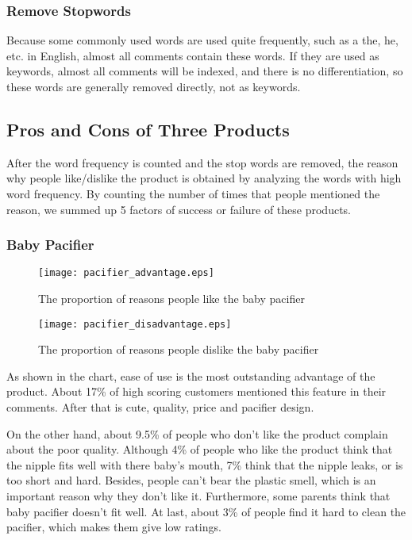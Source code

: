\documentclass{mcmthesis}
\begin{document}
	\subsubsection{Remove Stopwords}
	Because some commonly used words are used quite frequently, such as a the, he, etc. in English, almost all comments contain these words. If they are used as keywords, almost all comments will be indexed, and there is no differentiation, so these words are generally removed directly, not as keywords.
	
	
	\subsection{Pros and Cons of Three Products}
	
	After the word frequency is counted and the stop words are removed, the reason why people like/dislike the product is obtained by analyzing the words with high word frequency.
	By counting the number of times that people mentioned the reason, we summed up 5 factors of success or failure of these products.
	\subsubsection{Baby Pacifier}
	\begin{figure}[H]
		\begin{minipage}[t]{0.5\textwidth}
			\centering
			\texttt{[image: pacifier\_advantage.eps]}
			\caption{The proportion of reasons people like the baby pacifier\label{fig:1}}
		\end{minipage}
		\qquad
		\begin{minipage}[t]{0.5\textwidth}
			\centering
			\texttt{[image: pacifier\_disadvantage.eps]}
			\caption{The proportion of reasons people dislike the baby pacifier\label{fig:2}}
		\end{minipage}
	\end{figure}
	
	As shown in the chart, ease of use is the most outstanding advantage of the product. About 17\% of high scoring customers mentioned this feature in their comments. After that is cute, quality, price and pacifier design.
	
	
	On the other hand, about 9.5\% of people who don't like the product complain about the poor quality. Although 4\% of people who like the product think that the nipple fits well with there baby's mouth, 7\%  think that the nipple leaks, or is too short and hard. Besides, people can't bear the plastic smell, which is an important reason why they don't like it. Furthermore, some parents think that baby pacifier doesn't fit well. At last, about 3\% of people find it hard to clean the pacifier, which makes them give low ratings.
	
\end{document}
